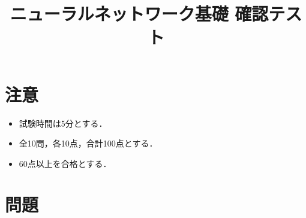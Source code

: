 \documentclass[uplatex,a4paper,12pt]{jsarticle}
\begin{document}
\title{ニューラルネットワーク基礎 確認テスト}
\author{}
\date{}
\maketitle

\section*{注意}
\begin{itemize}
\item 試験時間は5分とする．
\item 全10問，各10点，合計100点とする．
\item 60点以上を合格とする．
\end{itemize}

\section*{問題}
\end{document}
